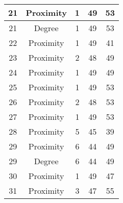 \documentclass[results.tex]{subfiles}
\begin{document}
\begin{center}
\begin{tabular}{| c || c | c | c | c |}
            \hline
            21                      & Proximity                    & 1                      & 49                      & 53                   \\
            \hline
            21                      & Degree                       & 1                      & 49                      & 53                   \\
            \hline
            22                      & Proximity                    & 1                      & 49                      & 41                   \\
            \hline
            23                      & Proximity                    & 2                      & 48                      & 49                   \\
            \hline
            24                      & Proximity                    & 1                      & 49                      & 49                   \\
            \hline
            25                      & Proximity                    & 1                      & 49                      & 53                   \\
            \hline
            26                      & Proximity                    & 2                      & 48                      & 53                   \\
            \hline
            27                      & Proximity                    & 1                      & 49                      & 53                   \\
            \hline
            28                      & Proximity                    & 5                      & 45                      & 39                   \\
            \hline
            29                      & Proximity                    & 6                      & 44                      & 49                   \\
            \hline
            29                      & Degree                       & 6                      & 44                      & 49                   \\
            \hline
            30                      & Proximity                    & 1                      & 49                      & 47                   \\
            \hline
            31                      & Proximity                    & 3                      & 47                      & 55                   \\

\end{tabular}
\end{center}
\end{document}
